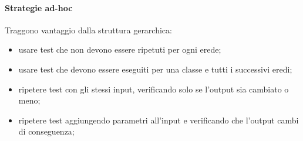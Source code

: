 \paragraph{Strategie ad-hoc} Traggono vantaggio dalla struttura gerarchica:
\begin{itemize}
    \item usare test che non devono essere ripetuti per ogni erede;
    \item usare test che devono essere eseguiti per una classe e tutti i successivi eredi;
    \item ripetere test con gli stessi input, verificando solo se l'output sia cambiato o meno;
    \item ripetere test aggiungendo parametri all'input e verificando che l'output cambi di conseguenza; 
\end{itemize}

\newpage
